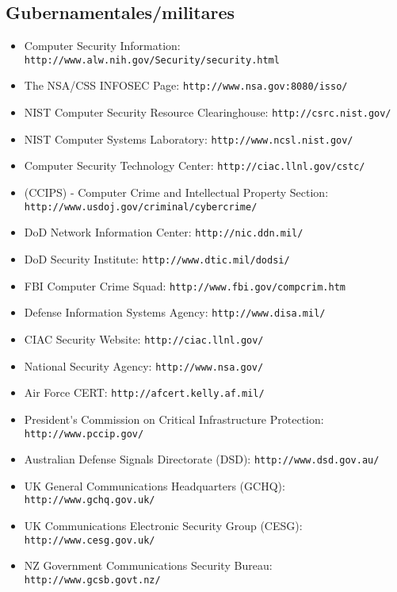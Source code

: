 \subsection{Gubernamentales/militares}
\begin{itemize}
\item Computer Security Information: {\tt http://www.alw.nih.gov/Security/security.html}
\item The NSA/CSS INFOSEC Page: {\tt http://www.nsa.gov:8080/isso/}
\item NIST Computer Security Resource Clearinghouse: {\tt http://csrc.nist.gov/}
\item NIST Computer Systems Laboratory: {\tt http://www.ncsl.nist.gov/}
\item Computer Security Technology Center: {\tt http://ciac.llnl.gov/cstc/}
\item (CCIPS) - Computer Crime and Intellectual Property Section:\\
{\tt http://www.usdoj.gov/criminal/cybercrime/}
\item DoD Network Information Center: {\tt http://nic.ddn.mil/}
\item DoD Security Institute: {\tt http://www.dtic.mil/dodsi/}
\item FBI Computer Crime Squad: {\tt http://www.fbi.gov/compcrim.htm}
\item Defense Information Systems Agency: {\tt http://www.disa.mil/}
\item CIAC Security Website: {\tt http://ciac.llnl.gov/}
\item National Security Agency: {\tt http://www.nsa.gov/}
\item Air Force CERT: {\tt http://afcert.kelly.af.mil/}
\item President\'{}s Commission on Critical Infrastructure Protection: 
{\tt http://www.pccip.gov/}
\item Australian Defense Signals Directorate (DSD): {\tt http://www.dsd.gov.au/}
\item UK General Communications Headquarters (GCHQ): {\tt http://www.gchq.gov.uk/}
\item UK Communications Electronic Security Group (CESG): {\tt http://www.cesg.gov.uk/}
\item NZ Government Communications Security Bureau: {\tt http://www.gcsb.govt.nz/}
\end{itemize}
